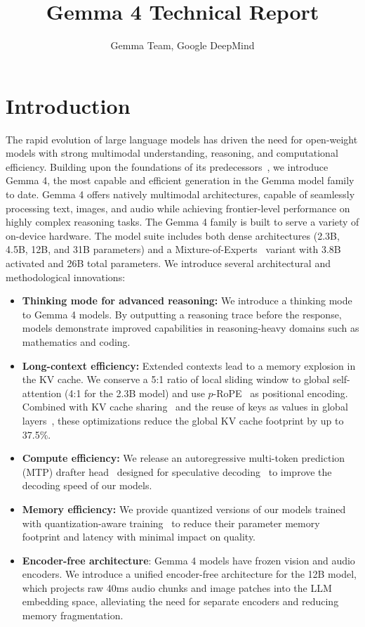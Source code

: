 \documentclass[11pt, a4paper, logo, twocolumn, copyright]{googledeepmind}
\title{Gemma 4 Technical Report}
\author{Gemma Team, Google DeepMind\authfootnotemark{1}}
\begin{document}
\maketitle

\section{Introduction}
The rapid evolution of large language models has driven the need for open-weight models with strong multimodal understanding, reasoning, and computational efficiency. Building upon the foundations of its predecessors~\citep{gemmateam2024gemma,gemmateam2024gemma2,gemmateam2025gemma}, we introduce Gemma 4, the most capable and efficient generation in the Gemma model family to date. Gemma 4 offers natively multimodal architectures, capable of seamlessly processing text, images, and audio while achieving frontier-level performance on highly complex reasoning tasks.
The Gemma 4 family is built to serve a variety of on-device hardware. The model suite includes both dense architectures (2.3B, 4.5B, 12B, and 31B parameters) and a Mixture-of-Experts~\citep[MoE]{jacobs1991adaptive} variant with 3.8B activated and 26B total parameters.
We introduce several architectural and methodological innovations:
\begin{itemize}[itemsep=1pt,leftmargin=10pt]
\item \textbf{Thinking mode for advanced reasoning:} We introduce a thinking mode~\citep{jaech2024openai} to Gemma 4 models. By outputting a reasoning trace before the response, models demonstrate improved capabilities in reasoning-heavy domains such as mathematics and coding.
\item \textbf{Long-context efficiency:} Extended contexts lead to a memory explosion in the KV cache. We conserve a 5:1 ratio of local sliding window to global self-attention (4:1 for the 2.3B model) and use $p$-RoPE~\citep{barbero2025round} as positional encoding. Combined with KV cache sharing~\citep{mqa} and the reuse of keys as values in global layers~\citep{kayyam2026transformers}, these optimizations reduce the global KV cache footprint by up to 37.5\%.
\item \textbf{Compute efficiency:} We release an autoregressive multi-token prediction (MTP) drafter head~\citep{li2024eagle} designed for speculative decoding~\citep{10.5555/3618408.3619203} to improve the decoding speed of our models. 
\item \textbf{Memory efficiency:} We provide quantized versions of our models trained with quantization-aware training~\citep[QAT]{jacob2018quantization} to reduce their parameter memory footprint and latency with minimal impact on quality.
\item \textbf{Encoder-free architecture}: Gemma 4 models have frozen vision and audio encoders. We introduce a unified encoder-free architecture for the 12B model, which projects raw 40ms audio chunks and image patches into the LLM embedding space, alleviating the need for separate encoders and reducing memory fragmentation.
\end{itemize}
\end{document}
